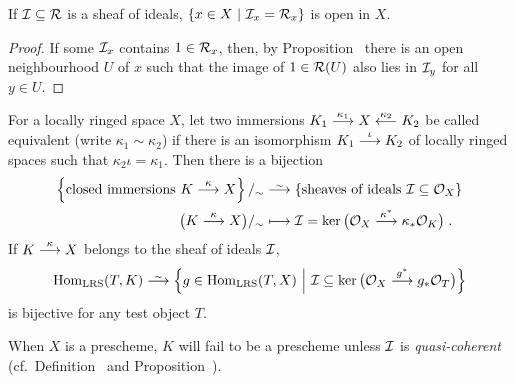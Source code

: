 \documentclass[a4paper,parskip=half,numbers=enddot, DIV=12]{scrreprt}
\begin{document}
\begin{cor}
    If $\mathcal{I}\subseteq \mathcal{R}$ is a sheaf of ideals, $\left\{x\in X\ \middle|\  \mathcal{I}_x=\mathcal{R}_x\right\}$ is open in $X$.
\end{cor}
\begin{proof}
	If some $\mathcal{I}_x$ contains $1\in \mathcal{R}_x$, then, by Proposition~ there is an open neighbourhood $U$ of $x$ such that the image of $1\in\mathcal{R}(U)$ also lies in $\mathcal{I}_y$ for all $y\in U$.
\end{proof}
\begin{prop}
    For a locally ringed space $X$, let two immersions $K_1\morphism[\kappa_1] X\lmorphism[\kappa_2] K_2$ be called equivalent (write $\kappa_1\sim\kappa_2$) if there is an isomorphism $K_1\morphism[\iota] K_2$ of locally ringed spaces such that $\kappa_2\iota = \kappa_1$. Then there is a bijection 
    \begin{align*}
	    \left\{\text{closed immersions }K\morphism[\kappa]X\right\}/_\sim&\isomorphism\left\{\text{sheaves of ideals }\Ii\subseteq \Oo_X\right\}\\
        \big(K\morphism[\kappa]X\big)/_\sim &\longmapsto \Ii = \ker\big(\Oo_X\morphism[\kappa^*]\kappa_* \Oo_K\big)\;.
    \end{align*}
    If $K\morphism[\kappa] X$ belongs to the sheaf of ideals $\mathcal{I}$,
    \begin{align*}
        \Hom_{\cat{LRS}}(T,K) \isomorphism\left\{ g\in \Hom_{\cat{LRS}}(T,X) \st \Ii\subseteq \ker\big(\Oo_X \morphism[g^*]g_*\Oo_T\big)\right\}
    \end{align*}
    is bijective for any test object $T$.
\end{prop}
\begin{rem*}
    When $X$ is a prescheme, $K$ will fail to be a prescheme unless $\mathcal{I}$ is \emph{quasi-coherent} (cf.\ Definition~ and Proposition~).
\end{rem*}
\end{document}
